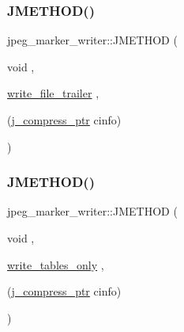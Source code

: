 \subsubsection{\texorpdfstring{JMETHOD()}{JMETHOD()}\hspace{0.1cm}{\footnotesize\ttfamily [4/7]}}
{\footnotesize\ttfamily jpeg\+\_\+marker\+\_\+writer\+::\+J\+M\+E\+T\+H\+OD (\begin{DoxyParamCaption}\item[{void}]{,  }\item[{\mbox{\hyperlink{jcmarker_8c_ab695fb3ccfb33e10a7d80689cd08d166}{write\+\_\+file\+\_\+trailer}}}]{,  }\item[{(\mbox{\hyperlink{jpeglib_8h_add2a072c54e3a51550f4975f7ddb91e7}{j\+\_\+compress\+\_\+ptr}} cinfo)}]{ }\end{DoxyParamCaption})}

\mbox{\label{structjpeg__marker__writer_ac0791e1ab4eb10f20144a84a1f0371dc}} 
\subsubsection{\texorpdfstring{JMETHOD()}{JMETHOD()}\hspace{0.1cm}{\footnotesize\ttfamily [5/7]}}
{\footnotesize\ttfamily jpeg\+\_\+marker\+\_\+writer\+::\+J\+M\+E\+T\+H\+OD (\begin{DoxyParamCaption}\item[{void}]{,  }\item[{\mbox{\hyperlink{jcmarker_8c_af5564bc6ecf1f982f588f18637c73906}{write\+\_\+tables\+\_\+only}}}]{,  }\item[{(\mbox{\hyperlink{jpeglib_8h_add2a072c54e3a51550f4975f7ddb91e7}{j\+\_\+compress\+\_\+ptr}} cinfo)}]{ }\end{DoxyParamCaption})}

\mbox{\label{structjpeg__marker__writer_a9719adf2a97800fee631854f46222889}} 
